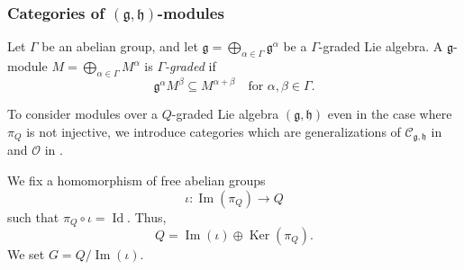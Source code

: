 \documentclass{beamer}
\DeclareMathOperator{\Id}{Id}
\DeclareMathOperator{\Ima}{Im}
\DeclareMathOperator{\Ker}{Ker}
\begin{document}
\begin{frame}
  \frametitle{Categories of $(\mathfrak{g}, \mathfrak{h})$-modules}
  Let $\Gamma$ be an abelian group, and let $\mathfrak{g} = \bigoplus_{\alpha \in \Gamma}\mathfrak{g}^{\alpha}$ be a $\Gamma$-graded Lie algebra.
  A $\mathfrak{g}$-module $M = \bigoplus_{\alpha \in \Gamma}M^{\alpha}$ is \emph{$\Gamma$-graded} if
  \begin{equation*}
    \mathfrak{g}^{\alpha}M^{\beta} \subseteq M^{\alpha + \beta} \quad \text{for $\alpha, \beta \in \Gamma$}.
  \end{equation*}

  To consider modules over a $Q$-graded Lie algebra $(\mathfrak{g}, \mathfrak{h})$ even in the case where $\pi_Q$ is not injective, we introduce categories which are generalizations of $\mathcal{C}_{\mathfrak{g}, \mathfrak{h}}$ in \cite{MR661694} and $\mathcal{O}$ in \cite{MR407097}.

  We fix a homomorphism of free abelian groups
  \begin{equation*}
    \iota: \Ima(\pi_Q) \to Q
  \end{equation*}
  such that $\pi_Q\circ\iota = \Id$.
  Thus,
  \begin{equation*}
    Q = \Ima(\iota) \oplus \Ker(\pi_Q).
  \end{equation*}
  We set $G = Q/\Ima(\iota)$.
\end{frame}
\end{document}
